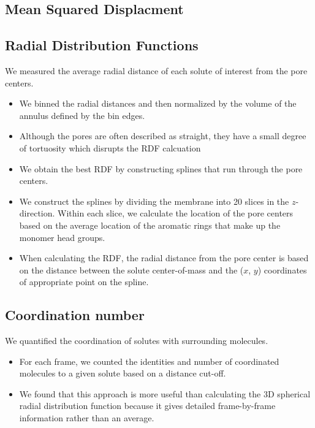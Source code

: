 \documentclass{article}
\begin{document}
  \subsection*{Mean Squared Displacment}

  \subsection*{Radial Distribution Functions}

  We measured the average radial distance of each solute of interest from the pore
  centers.
  \begin{itemize}
	\item We binned the radial distances and then normalized by the volume
	of the annulus defined by the bin edges.
	\item Although the pores are often described as straight, they have a
	small degree of tortuosity which disrupts the RDF calcuation 
	\item We obtain the best RDF by constructing splines that run through the
	pore centers.
	\item We construct the splines by dividing the membrane into 20 slices
	in the $z$-direction. Within each slice, we calculate the location of 
	the pore centers based on the average location of the aromatic rings
	that make up the monomer head groups.
	\item When calculating the RDF, the radial distance from the pore center
	is based on the distance between the solute center-of-mass and the ($x$, $y$)
	coordinates of appropriate point on the spline.
  \end{itemize}

  \subsection*{Coordination number}

  We quantified the coordination of solutes with surrounding molecules.
  \begin{itemize}
  	\item For each frame, we counted the identities and number of
  	coordinated molecules to a given solute based on a distance cut-off. 
	\item We found that this approach is more useful than calculating the
	3D spherical radial distribution function because it gives detailed
	frame-by-frame information rather than an average. 
  \end{itemize}
   
\end{document}
